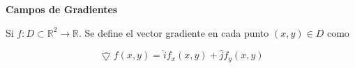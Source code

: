 \documentclass{beamer}
\begin{document}
\begin{frame}
\textbf{Campos de Gradientes}

\hfill

Si $f: D \subset \mathbb{R}^2 \rightarrow \mathbb{R}$. Se define el vector gradiente en cada punto $(x,y) \in D$ como 

\[
\bar{\bigtriangledown } f(x,y) = \hat{i} f_x (x,y) + \hat{j} f_y (x,y)
\]

\end{frame}

\begin{frame}

\end{frame}

\begin{frame}

\end{frame}

\begin{frame}

\end{frame}

\begin{frame}

\end{frame}

\begin{frame}

\end{frame}

\begin{frame}

\end{frame}

\begin{frame}

\end{frame}

\begin{frame}

\end{frame}

\begin{frame}

\end{frame}
\end{document}
